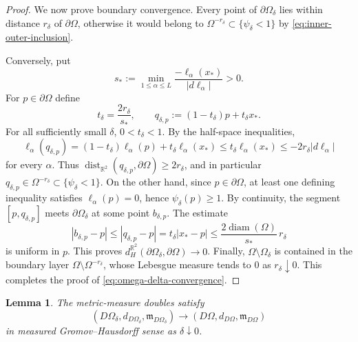 \documentclass[11pt]{amsart}
\newtheorem{lemma}[theorem]{Lemma}
\numberwithin{equation}{section}
\DeclareMathOperator{\diam}{diam}
\DeclareMathOperator{\dist}{dist}
\newcommand{\R}{\mathbb R}
\newcommand{\Om}{\Omega}
\newcommand{\mm}{\mathfrak m}
\begin{document}
\begin{proof}
We now prove boundary convergence.  Every point of $\partial\Om_\delta$ lies
within distance $r_\delta$ of $\partial\Om$, otherwise it would belong to
$\Om^{-r_\delta}\subset\{\psi_\delta<1\}$ by \eqref{eq:inner-outer-inclusion}.

Conversely, put
$$
s_*:=\min_{1\le\alpha\le L}\frac{-\ell_\alpha(x_*)}{|d\ell_\alpha|}>0.
$$
For $p\in\partial\Om$ define
$$
t_\delta=\frac{2r_\delta}{s_*},
\qquad
q_{\delta,p}:=(1-t_\delta)p+t_\delta x_* .
$$
For all sufficiently small $\delta$, $0<t_\delta<1$.  By the half-space
inequalities,
$$
\ell_\alpha(q_{\delta,p})
=(1-t_\delta)\ell_\alpha(p)+t_\delta\ell_\alpha(x_*)
\le t_\delta\ell_\alpha(x_*)
\le -2r_\delta |d\ell_\alpha|
$$
for every $\alpha$.  Thus $\dist_{\R^2}(q_{\delta,p},\partial\Om)\ge2r_\delta$, and in
particular $q_{\delta,p}\in\Om^{-r_\delta}\subset\{\psi_\delta<1\}$.  On the
other hand, since $p\in\partial\Om$, at least one defining inequality satisfies
$\ell_\alpha(p)=0$, hence $\psi_\delta(p)\ge1$.  By continuity, the segment
$[p,q_{\delta,p}]$ meets $\partial\Om_\delta$ at some point $b_{\delta,p}$.  The
estimate
$$
|b_{\delta,p}-p|\le |q_{\delta,p}-p|
=t_\delta |x_*-p|
\le \frac{2\diam(\Om)}{s_*}\,r_\delta
$$
is uniform in $p$.  This proves $d_H^{\R^2}(\partial\Om_\delta,\partial\Om)\to0$.
Finally, $\Om\setminus\Om_\delta$ is contained in the boundary layer
$\Om\setminus\Om^{-r_\delta}$, whose Lebesgue measure tends to $0$ as
$r_\delta\downarrow0$.  This completes the proof of \eqref{eq:omega-delta-convergence}.
\end{proof}

\begin{lemma}\label{lem:doubles-converge}
The metric-measure doubles satisfy
\begin{equation}\label{eq:doubles-converge}
(D\Om_\delta,d_{D\Om_\delta},\mm_{D\Om_\delta})
\longrightarrow
(D\Om,d_{D\Om},\mm_{D\Om})
\end{equation}
in measured Gromov--Hausdorff sense as $\delta\downarrow0$.
\end{lemma}
\end{document}
